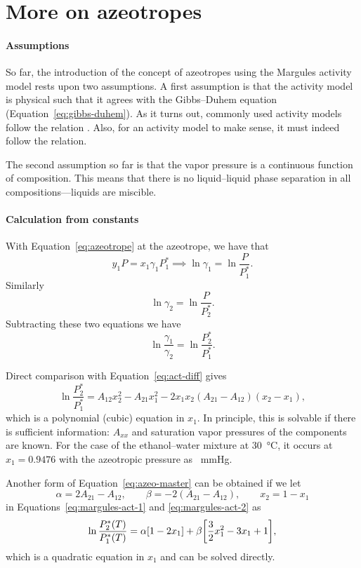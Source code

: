 \section{More on azeotropes}

\paragraph{Assumptions}
So far, the introduction of the concept of azeotropes using the Margules
activity model rests upon two assumptions. A first assumption is that the
activity model is physical such that it agrees with the Gibbs--Duhem equation
(Equation~\ref{eq:gibbs-duhem}). As it turns out, commonly used activity 
models follow the relation \cite[p.~440]{enggbook}. Also, for an
activity model to make sense, it must indeed follow the relation.

The second assumption so far is that the vapor pressure is a continuous function
of composition. This means that there is no liquid--liquid phase separation
in all compositions---liquids are miscible.

\paragraph{Calculation from constants}
With Equation~\ref{eq:azeotrope} at the azeotrope, we have that
\[
    y_1P = x_1\gamma_1P_1^* \implies \ln\gamma_1 = \ln \dfrac{P}{P_1^*}.
\]
Similarly
\[
    \ln\gamma_2 = \ln \dfrac{P}{P_2^*}.
\]
Subtracting these two equations we have
\begin{equation}\label{eq:act-diff2}
    \ln \dfrac{\gamma_1}{\gamma_2} = \ln \dfrac{P_2^*}{P_1^*}.
\end{equation}

Direct comparison with Equation~\ref{eq:act-diff} gives
\begin{equation}\label{eq:azeo-master}
    \ln \dfrac{P_2^*}{P_1^*} = A_{12}x_2^2 - A_{21}x_1^2 - 2x_1x_2
    (A_{21} - A_{12})(x_2 - x_1),
\end{equation}
which is a polynomial (cubic) equation in $x_1$. In principle, this is
solvable if there is sufficient information: $A_{xx}$ and
saturation vapor pressures of the components are known. For the case of
the ethanol--water mixture at \SI{30}{\celsius}, it occurs at $x_1 = 0.9476$
with the azeotropic pressure as \SI{}{\mmHg}.

Another form of Equation~\ref{eq:azeo-master} can be obtained if we let
\[
    \alpha = 2A_{21} - A_{12},\qquad \beta = -2(A_{21} - A_{12}),\qquad
    x_2 = 1 - x_1
\]
in Equations~\ref{eq:margules-act-1} and \ref{eq:margules-act-2} as
\begin{equation}\label{eq:azeo-master2}
    \ln \dfrac{P_2^*(T)}{P_1^*(T)} = \alpha[1 - 2x_1] + \beta\qty[\frac32 x_1^2
    -3x_1 + 1],
\end{equation}
which is a quadratic equation in $x_1$ and can be solved directly.

